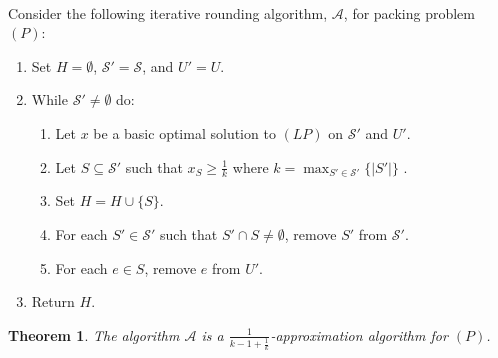 \documentclass[letterpaper,12pt,oneside,onecolumn]{article}
\newcommand{\cA}{\mathcal{A}} \newcommand{\cB}{\mathcal{B}}
\newcommand{\cS}{\mathcal{S}} \newcommand{\cT}{\mathcal{T}}
\newtheorem{theorem}[fact]{Theorem}
\begin{document}
\paragraph{}
Consider the following iterative rounding algorithm, $\cA$, for packing problem $(P)$:
\begin{enumerate}
\item Set $H = \emptyset$, $\cS' = \cS$, and $U' = U$.
\item While $\cS' \neq \emptyset$ do:
	\begin{enumerate}
	\item Let $x$ be a basic optimal solution to $(LP)$ on $\cS'$ and $U'$.
	\item Let $S \subseteq \cS'$ such that $x_S \geq \frac{1}{k}$ where $k = \max_{S' \in \cS'}\{|S'|\}$ .
	\item Set $H = H \cup \{S\}$.
	\item For each $S' \in \cS'$ such that $S' \cap S \neq \emptyset$, remove $S'$ from $\cS'$.
	\item For each $e \in S$, remove $e$ from $U'$. 
	\end{enumerate}
\item Return $H$.
\end{enumerate}
\begin{theorem}
The algorithm $\cA$ is a $\frac{1}{k-1+\frac{1}{k}}$-approximation algorithm for $(P)$.
\end{theorem}
\end{document}
